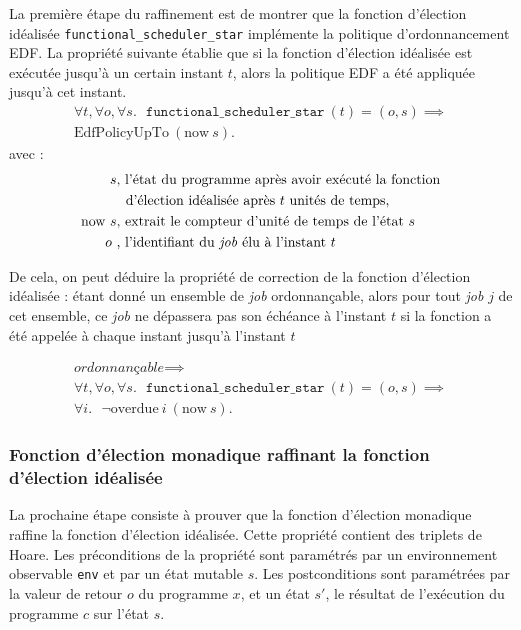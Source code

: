	La première étape du raffinement est de montrer que la fonction d'élection idéalisée \texttt{functional\_scheduler\_star} implémente la politique d'ordonnancement EDF. La propriété suivante établie que si la fonction d'élection idéalisée est exécutée jusqu'à un certain instant $t$, alors la politique EDF a été appliquée jusqu'à cet instant.
	\begin{gather*}
		\forall t, \forall o, \forall s.~~~\texttt{functional\_scheduler\_star}~(t) = (o,s) \implies\\
		\text{EdfPolicyUpTo}~(\text{now}~s).
	\end{gather*}
\indent	avec :
	\begin{align*}
		s&\text{, l'état du programme après avoir exécuté la fonction}\\
		&~~\text{d'élection idéalisée après $t$ unités de temps},\\
		\text{now}~s&\text{, extrait le compteur d'unité de temps de l'état $s$}\\
		o~&\text{, l'identifiant du \emph{job} élu à l'instant $t$}
	\end{align*}

	De cela, on peut déduire la propriété de correction de la fonction d'élection idéalisée :
	étant donné un ensemble de \emph{job} ordonnançable, alors pour tout \emph{job} $j$ de cet ensemble, ce \emph{job} ne dépassera pas son échéance à l'instant $t$ si la fonction a été appelée à chaque instant jusqu'à l'instant $t$

	\begin{gather*}
		\textit{ordonnançable} \implies\\
		\forall t, \forall o, \forall s.~~~\texttt{functional\_scheduler\_star}~(t) = (o,s) \implies\\
		\forall i.~~~\neg \text{overdue}~i~(\text{now}~s).
	\end{gather*}

	\subsubsection{Fonction d'élection monadique raffinant la fonction d'élection idéalisée}
	\label{sec:monadic}

	La prochaine étape consiste à prouver que la fonction d'élection monadique raffine la fonction d'élection idéalisée. Cette propriété contient des triplets de Hoare. 
	Les préconditions de la propriété sont paramétrés par un environnement observable \texttt{env} et par un état mutable $s$. Les postconditions sont paramétrées par la valeur de retour $o$ du programme $x$, et un état $s'$, le résultat de l'exécution du programme $c$ sur l'état $s$.

